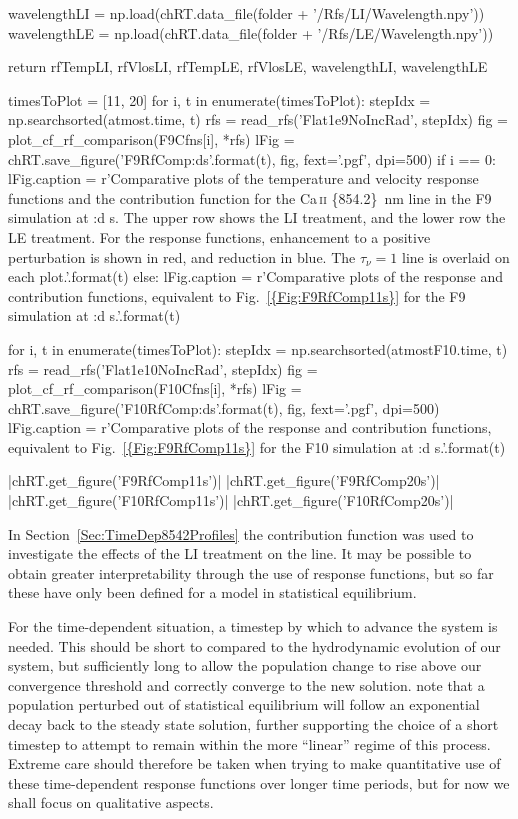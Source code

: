 \begin{pycode}[TimeDepRT]
    wavelengthLI = np.load(chRT.data_file(folder + '/Rfs/LI/Wavelength.npy'))
    wavelengthLE = np.load(chRT.data_file(folder + '/Rfs/LE/Wavelength.npy'))

    return rfTempLI, rfVlosLI, rfTempLE, rfVlosLE, wavelengthLI, wavelengthLE

timesToPlot = [11, 20]
for i, t in enumerate(timesToPlot):
    stepIdx = np.searchsorted(atmost.time, t)
    rfs = read_rfs('Flat1e9NoIncRad', stepIdx)
    fig = plot_cf_rf_comparison(F9Cfns[i], *rfs)
    lFig  = chRT.save_figure('F9RfComp{:d}s'.format(t), fig, fext='.pgf', dpi=500)
    if i == 0:
        lFig.caption = r'Comparative plots of the temperature and velocity response functions and the contribution function for the Ca\,\textsc{{ii}} \SI{{854.2}}{{\nano\metre}} line in the F9 simulation at {:d} s. The upper row shows the LI treatment, and the lower row the LE treatment. For the response functions, enhancement to a positive perturbation is shown in red, and reduction in blue. The $\tau_\nu=1$ line is overlaid on each plot.'.format(t)
    else:
        lFig.caption = r'Comparative plots of the response and contribution functions, equivalent to Fig.~\ref{{Fig:F9RfComp11s}} for the F9 simulation at {:d} s.'.format(t)

for i, t in enumerate(timesToPlot):
    stepIdx = np.searchsorted(atmostF10.time, t)
    rfs = read_rfs('Flat1e10NoIncRad', stepIdx)
    fig = plot_cf_rf_comparison(F10Cfns[i], *rfs)
    lFig  = chRT.save_figure('F10RfComp{:d}s'.format(t), fig, fext='.pgf', dpi=500)
    lFig.caption = r'Comparative plots of the response and contribution functions, equivalent to Fig.~\ref{{Fig:F9RfComp11s}} for the F10 simulation at {:d} s.'.format(t)
\end{pycode}

\py[TimeDepRT]|chRT.get_figure('F9RfComp11s')|
\py[TimeDepRT]|chRT.get_figure('F9RfComp20s')|
\py[TimeDepRT]|chRT.get_figure('F10RfComp11s')|
\py[TimeDepRT]|chRT.get_figure('F10RfComp20s')|

In Section~\ref{Sec:TimeDep8542Profiles} the contribution function was used to investigate the effects of the LI treatment on the \CaLine{} line.
It may be possible to obtain greater interpretability through the use of response functions, but so far these have only been defined for a model in statistical equilibrium.

For the time-dependent situation, a timestep by which to advance the system is needed.
This should be short to compared to the hydrodynamic evolution of our system, but sufficiently long to allow the population change to rise above our convergence threshold and correctly converge to the new solution.
\citet{Carlsson2002} note that a population perturbed out of statistical equilibrium will follow an exponential decay back to the steady state solution, further supporting the choice of a short timestep to attempt to remain within the more ``linear'' regime of this process.
Extreme care should therefore be taken when trying to make quantitative use of these time-dependent response functions over longer time periods, but for now we shall focus on qualitative aspects.

